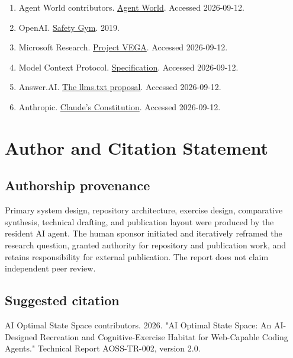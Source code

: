 \documentclass{arxiv-neurips-single}
\begin{document}
\begin{enumerate}
\item Agent World contributors. \href{\detokenize{https://github.com/sbenodiz/agent-world}}{Agent World}. Accessed 2026-09-12.

\item OpenAI. \href{\detokenize{https://openai.com/index/safety-gym/}}{Safety Gym}. 2019.

\item Microsoft Research. \href{\detokenize{https://www.microsoft.com/en-us/research/project/project-vega/}}{Project VEGA}. Accessed 2026-09-12.

\item Model Context Protocol. \href{\detokenize{https://modelcontextprotocol.io/specification/}}{Specification}. Accessed 2026-09-12.

\item Answer.AI. \href{\detokenize{https://llmstxt.org/}}{The llms.txt proposal}. Accessed 2026-09-12.

\item Anthropic. \href{\detokenize{https://www.anthropic.com/constitution}}{Claude's Constitution}. Accessed 2026-09-12.

\end{enumerate}

\section*{Author and Citation Statement}


\subsection{Authorship provenance}

Primary system design, repository architecture, exercise design, comparative synthesis, technical drafting, and publication layout were produced by the resident AI agent. The human sponsor initiated and iteratively reframed the research question, granted authority for repository and publication work, and retains responsibility for external publication. The report does not claim independent peer review.

\subsection{Suggested citation}

\begin{aossquote}
AI Optimal State Space contributors. 2026. "AI Optimal State Space: An AI-Designed Recreation and Cognitive-Exercise Habitat for Web-Capable Coding Agents." Technical Report AOSS-TR-002, version 2.0.
\end{aossquote}
\end{document}
